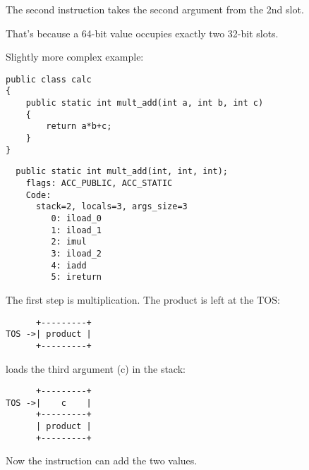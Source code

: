 The second  instruction takes the second argument from the 2nd slot.

That's because a 64-bit  value occupies exactly two 32-bit slots.


Slightly more complex example:


\begin{lstlisting}[style=customjava]
public class calc
{
	public static int mult_add(int a, int b, int c)
	{
		return a*b+c;
	}
}
\end{lstlisting}

\begin{lstlisting}
  public static int mult_add(int, int, int);
    flags: ACC_PUBLIC, ACC_STATIC
    Code:
      stack=2, locals=3, args_size=3
         0: iload_0       
         1: iload_1       
         2: imul          
         3: iload_2       
         4: iadd          
         5: ireturn       
\end{lstlisting}

The first step is multiplication. The product is left at the \ac{TOS}:


\begin{lstlisting}
      +---------+
TOS ->| product |
      +---------+
\end{lstlisting}

 loads the third argument (c) in the stack:

\begin{lstlisting}
      +---------+
TOS ->|    c    |
      +---------+
      | product |
      +---------+
\end{lstlisting}

Now the  instruction can add the two values.

